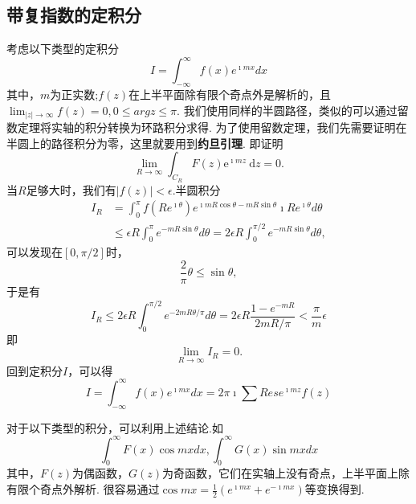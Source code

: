  \subsection{带复指数的定积分}
 考虑以下类型的定积分
 \begin{equation}
    I=\int_{-\infty}^{\infty} f(x) e^{\imath m x} d x
\end{equation}
其中，$m$为正实数;$f(z)$在上半平面除有限个奇点外是解析的，且$\lim_{|z|\to \infty} f(z) = 0, 0 \leq arg z \leq \pi$.
我们使用同样的半圆路径，类似的可以通过留数定理将实轴的积分转换为环路积分求得.
为了使用留数定理，我们先需要证明在半圆上的路径积分为零，这里就要用到\textbf{约旦引理}.
即证明
\begin{equation}
    \lim _{R \rightarrow \infty} \int_{C_R} F(z) \mathrm{e}^{\imath m z} \mathrm{~d} z=0 .
\end{equation}
当$R$足够大时，我们有$|f(z)| < \epsilon$.半圆积分
\begin{align}
    I_R&=\int_0^\pi f\left(R e^{\imath \theta}\right) 
    e^{\imath m R \cos \theta- m R \sin \theta} \imath R e^{\imath \theta} d \theta
    \\
    &\leq \epsilon R \int_0^\pi e^{-m R \sin \theta} d \theta=2 \epsilon R \int_0^{\pi / 2} e^{-m R \sin \theta} d \theta,
\end{align}
可以发现在$\left[ 0, \pi/2\right]$时，
\begin{equation}
    \frac{2}{\pi}\theta \leq \sin{\theta},
\end{equation}
于是有
\begin{equation}
    I_R \leq 2 \epsilon R \int_0^{\pi / 2} e^{-2 m R \theta / \pi} d \theta=2 \epsilon R \frac{1-e^{-m R}}{2 m R / \pi}<\frac{\pi}{m} \epsilon
\end{equation}
即
\begin{equation}
    \lim_{R\to \infty} I_R = 0.
\end{equation}
回到定积分$I$，可以得
\begin{equation}
    I=\int_{-\infty}^{\infty} f(x) e^{ \imath m x} d x = 2\pi \imath \sum Res e^{\imath m z} f(z)
\end{equation}

对于以下类型的积分，可以利用上述结论.如
\begin{equation}
    \int_{0}^{\infty} F(x) \cos {m x} dx, \int_{0}^{\infty} G(x) \sin{m x} dx
\end{equation}
其中，$F(z)$为偶函数，$G(z)$为奇函数，它们在实轴上没有奇点，上半平面上除有限个奇点外解析.
很容易通过$\cos{mx} = \frac{1}{2}\left( e^{\imath m x} + e^{-\imath mx}\right)$等变换得到.
